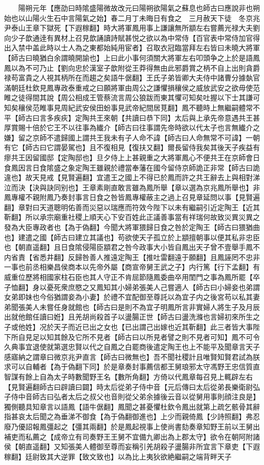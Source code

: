 　　陽朔元年【應劭曰時隂盛陽微故改元曰陽朔欲陽氣之蘇息也師古曰應說非也朔始也以山陽火生石中言陽氣之始】春二月丁未晦日有食之　三月赦天下徒　冬京兆尹泰山王章下獄死【下遐稼翻】時大將軍鳳用事上謙讓無所顓左右嘗薦光禄大夫劉向少子歆通逹有異材上召見歆誦讀詩賦甚悦之欲以為中常侍【百官表中常侍加官得出入禁中盖此時以士人為之東都始純用宦者】召取衣冠臨當拜左右皆曰未曉大將軍【師古曰曉猶白余謂曉開諭也】上曰此小事何須關大將軍左右叩頭争之上於是語鳳鳳以為不可乃止【劉向忠於漢室子歆附從王莽得無由此邪爵賞之柄不自上出則貪爵禄苟富貴之人視其柄所在而趨之矣語牛倨翻】王氏子弟皆卿大夫侍中諸曹分據埶官滿朝廷杜欽見鳳專政泰重戒之曰願將軍由周公之謙懼損穰侯之威放武安之欲毋使范睢之徒得間其說【周公相成王管蔡流言周公狼跋而東其懼可知矣吐握以下士其謙可知矣穰侯范睢事見周紀武安侯田蚡事見武帝紀間居莧翻】鳳不聽時上無繼嗣體常不平【師古曰言多疾疢】定陶共王來朝【共讀曰恭下同】太后與上承先帝意遇共王甚厚賞賜十倍於它王不以往事為纎介【師古曰往事謂先帝時欲以代太子也言無纎介之嫌】留之京師不遣歸國上謂共王我未有子人命不諱【師古曰人命無常不可諱】一朝有它【師古曰它謂晏駕也】且不復相見【復扶又翻】爾長留侍我矣其後天子疾益有瘳共王因留國邸【定陶邸也】旦夕侍上上甚親重之大將軍鳳心不便共王在京師會日食鳳因言日食隂盛之象定陶王雖親於禮當奉藩在國今留侍京師詭正非常【師古曰詭違也】故天見戒【見賢遍翻】宜遣王之國上不得已於鳳而許之共王辭去上與相對涕泣而決【決與訣同别也】王章素剛直敢言雖為鳳所舉【章以選為京兆鳳所舉也】非鳳專權不親附鳳乃奏封事言日食之咎皆鳳專權蔽主之過上召見章延問以事【見賢遍翻】章對曰天道聰明佑善而災惡以瑞應而符效今陛下以未有繼嗣引近定陶王【近其靳翻】所以承宗廟重社稷上順天心下安百姓此正議善事當有祥瑞何故致災異災異之發為大臣專政者也【為于偽翻】今聞大將軍猥歸日食之咎於定陶王【師古曰猥猶曲也】建遣之國【師古曰建立其議也】苟欲使天子孤立於上顓擅朝事以便其私非忠臣也【朝直遥翻】且日食隂侵陽臣顓君之咎今政事大小皆自鳳出天子曾不壹舉手鳳不内省責【省悉井翻】反歸咎善人推遠定陶王【推吐雷翻遠于願翻】且鳳誣罔不忠非一事也前丞相樂昌侯商本以先帝外屬【商宣帝舅王武之子】内行篤【行下孟翻】有威重位歷將相國家柱石臣也其人守正不肯屈節隨鳳委曲卒用閨門之事為鳳所罷【卒子恤翻】身以憂死衆庶愍之又鳳知其小婦弟張美人己嘗適人【師古曰小婦妾也弟謂女弟即妹也今俗猶謂妾為小妻】於禮不宜配御至尊託以為宜子内之後宮苟以私其妻弟聞張美人未嘗任身就館也【師古曰是則不為宜子明鳳所言非實婦人將生子及月辰出就他館任讀曰姙】且羌胡尚殺首子以盪腸正世【師古曰盪洗滌也言婦初來所生之子或他姓】况於天子而近已出之女也【已出謂己出嫁也近其靳翻】此三者皆大事陛下所自見足以知其餘及它所不見者【師古曰以所見者譬之則不見者可知】鳳不可令久典事宜退使就第選忠賢以代之自鳳之白罷商後遣定陶王也上不能平及聞章言天子感寤納之謂章曰微京兆尹直言【師古曰微無也】吾不聞社稷計且唯賢知賢君試為朕求可以自輔者【為于偽翻下同】於是章奏封事薦信都王舅琅邪太守馮野王忠信質直智謀有餘上自為太子時數聞野王名【數所角翻】方倚以代鳳章每召見上輒辟左右【見賢遍翻師古曰辟讀曰闢】時太后從弟子侍中音【元后傳曰太后從弟長樂衛尉弘子侍中音師古曰弘者太后之叔父也音則從父弟余據後云音以從舅用事則顔注良是】獨側聽具知章言以語鳳【語牛倨翻】鳳聞之甚憂懼杜欽令鳳出就第上疏乞骸骨其辭指甚哀太后聞之為垂涕不御食【為于偽翻御進也】上少而親倚鳳【少詩照翻】弗忍廢乃優詔報鳳彊起之【彊其兩翻】於是鳳起視事上使尚書劾奏章知野王前以王舅出補吏而私薦之【成帝立有司奏野王王舅不宜備九卿出為上郡太守】欲令在朝阿附諸侯【朝直遥翻】又知張美人體御至尊而妄稱引羌胡殺子盪腸非所宜言下章吏【下遐稼翻】廷尉致其大逆罪【致文致也】以為比上夷狄欲絶繼嗣之端背畔天子